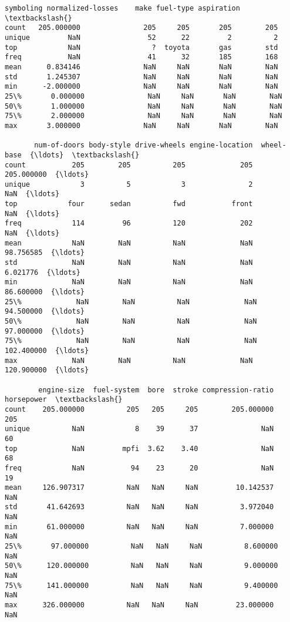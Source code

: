 \documentclass[11pt]{article}
\newcommand{\prompt}[4]{
        \llap{{\color{#2}[#3]: #4}}\vspace{-1.25em}
    }
\begin{document}
            \begin{tcolorbox}[breakable, boxrule=.5pt, size=fbox, pad at break*=1mm, opacityfill=0]
\prompt{Out}{outcolor}{14}{\hspace{3.5pt}}
\begin{Verbatim}[commandchars=\\\{\}]
         symboling normalized-losses    make fuel-type aspiration  \textbackslash{}
count   205.000000               205     205       205        205
unique         NaN                52      22         2          2
top            NaN                 ?  toyota       gas        std
freq           NaN                41      32       185        168
mean      0.834146               NaN     NaN       NaN        NaN
std       1.245307               NaN     NaN       NaN        NaN
min      -2.000000               NaN     NaN       NaN        NaN
25\%       0.000000               NaN     NaN       NaN        NaN
50\%       1.000000               NaN     NaN       NaN        NaN
75\%       2.000000               NaN     NaN       NaN        NaN
max       3.000000               NaN     NaN       NaN        NaN

       num-of-doors body-style drive-wheels engine-location  wheel-base  {\ldots}  \textbackslash{}
count           205        205          205             205  205.000000  {\ldots}
unique            3          5            3               2         NaN  {\ldots}
top            four      sedan          fwd           front         NaN  {\ldots}
freq            114         96          120             202         NaN  {\ldots}
mean            NaN        NaN          NaN             NaN   98.756585  {\ldots}
std             NaN        NaN          NaN             NaN    6.021776  {\ldots}
min             NaN        NaN          NaN             NaN   86.600000  {\ldots}
25\%             NaN        NaN          NaN             NaN   94.500000  {\ldots}
50\%             NaN        NaN          NaN             NaN   97.000000  {\ldots}
75\%             NaN        NaN          NaN             NaN  102.400000  {\ldots}
max             NaN        NaN          NaN             NaN  120.900000  {\ldots}

        engine-size  fuel-system  bore  stroke compression-ratio horsepower  \textbackslash{}
count    205.000000          205   205     205        205.000000        205
unique          NaN            8    39      37               NaN         60
top             NaN         mpfi  3.62    3.40               NaN         68
freq            NaN           94    23      20               NaN         19
mean     126.907317          NaN   NaN     NaN         10.142537        NaN
std       41.642693          NaN   NaN     NaN          3.972040        NaN
min       61.000000          NaN   NaN     NaN          7.000000        NaN
25\%       97.000000          NaN   NaN     NaN          8.600000        NaN
50\%      120.000000          NaN   NaN     NaN          9.000000        NaN
75\%      141.000000          NaN   NaN     NaN          9.400000        NaN
max      326.000000          NaN   NaN     NaN         23.000000        NaN


\end{Verbatim}
\end{tcolorbox}
\end{document}
